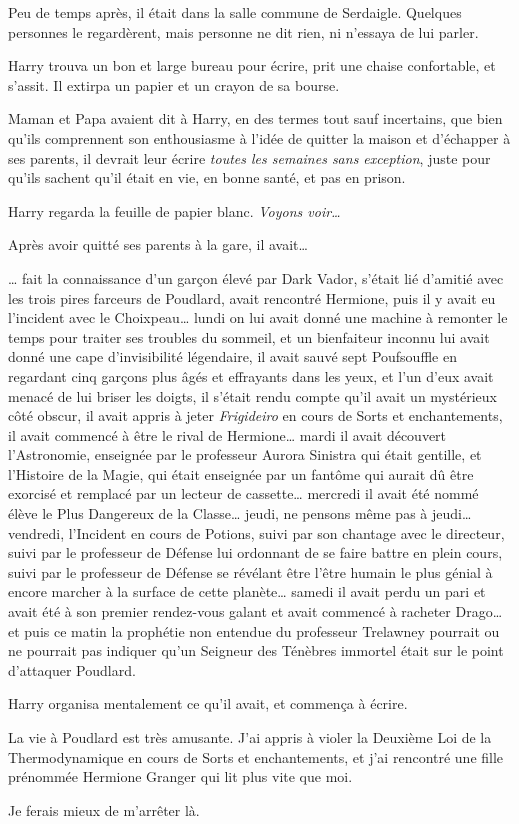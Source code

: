 Peu de temps après, il était dans la salle commune de Serdaigle. Quelques personnes le regardèrent, mais personne ne dit rien, ni n'essaya de lui parler.

Harry trouva un bon et large bureau pour écrire, prit une chaise confortable, et s'assit. Il extirpa un papier et un crayon de sa bourse.

Maman et Papa avaient dit à Harry, en des termes tout sauf incertains, que bien qu'ils comprennent son enthousiasme à l'idée de quitter la maison et d'échapper à ses parents, il devrait leur écrire \emph{toutes les semaines sans exception}, juste pour qu'ils sachent qu'il était en vie, en bonne santé, et pas en prison.

Harry regarda la feuille de papier blanc. \emph{Voyons voir…}

Après avoir quitté ses parents à la gare, il avait…

… fait la connaissance d'un garçon élevé par Dark Vador, s'était lié d'amitié avec les trois pires farceurs de Poudlard, avait rencontré Hermione, puis il y avait eu l'incident avec le Choixpeau… lundi on lui avait donné une machine à remonter le temps pour traiter ses troubles du sommeil, et un bienfaiteur inconnu lui avait donné une cape d'invisibilité légendaire, il avait sauvé sept Poufsouffle en regardant cinq garçons plus âgés et effrayants dans les yeux, et l'un d'eux avait menacé de lui briser les doigts, il s'était rendu compte qu'il avait un mystérieux côté obscur, il avait appris à jeter \emph{Frigideiro} en cours de Sorts et enchantements, il avait commencé à être le rival de Hermione… mardi il avait découvert l'Astronomie, enseignée par le professeur Aurora Sinistra qui était gentille, et l'Histoire de la Magie, qui était enseignée par un fantôme qui aurait dû être exorcisé et remplacé par un lecteur de cassette… mercredi il avait été nommé élève le Plus Dangereux de la Classe… jeudi, ne pensons même pas à jeudi… vendredi, l'Incident en cours de Potions, suivi par son chantage avec le directeur, suivi par le professeur de Défense lui ordonnant de se faire battre en plein cours, suivi par le professeur de Défense se révélant être l'être humain le plus génial à encore marcher à la surface de cette planète… samedi il avait perdu un pari et avait été à son premier rendez-vous galant et avait commencé à racheter Drago… et puis ce matin la prophétie non entendue du professeur Trelawney pourrait ou ne pourrait pas indiquer qu'un Seigneur des Ténèbres immortel était sur le point d'attaquer Poudlard.

Harry organisa mentalement ce qu'il avait, et commença à écrire.
\begin{writtenNote}

La vie à Poudlard est très amusante. J'ai appris à violer la Deuxième Loi de la Thermodynamique en cours de Sorts et enchantements, et j'ai rencontré une fille prénommée Hermione Granger qui lit plus vite que moi.

Je ferais mieux de m'arrêter là.

\end{writtenNote}


